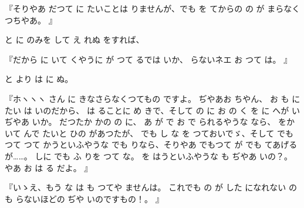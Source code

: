 『そりやあ
だつて
に
たいことは
りませんが、でも
を
てからの
の
が
まらなくつちやあ。
』

と
に
のみを
して
え
れぬ
をすれば、

『だから
に
いて
くやうに
が
つて
るでは
いか、
らないネエ
お
つて
は。
』

と
より
は
に
ぬ。

『ホヽヽヽ
さん
に
きなさらなくつてもの
ですよ。
ぢやあお
ちやん、
お
も
に
たい
は
いのだから、
は
ることに
め
きで、そして
の
に
お
の
く
を
に
へが
いぢやあ
いか。
だつたか
かの
の
に、
あ
が
で
お
で
られるやうな
なら、
をかいて
んで
たいと
ひの
があつたが、
でも
し
な
を
つておいでゞ、そして
でもつて
つて
かうといふやうな
でも
りなら、そりやあ
でもつて
が
でも
てあげるが……。
しに
でも
ふ
りを
つて
な。
を
はうといふやうな
も
ぢやあ
いの？。
やあ
お
は
る
だよ。
』

『いゝえ、もう
な
は
も
つてや
ませんは。
これでも
の
が
した
になれない
の
も
らないほどの
ぢや
いのですもの！。
』

